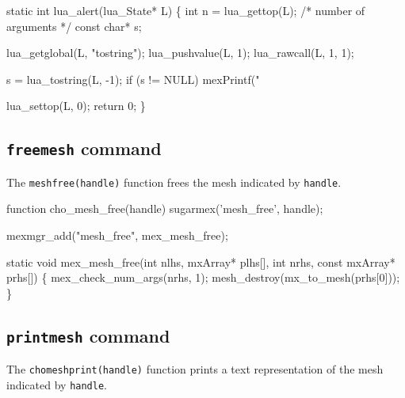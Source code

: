 \nwendcode{}\nwdocspar

\nwenddocs{}\plusendmoddef
static int lua_alert(lua_State* L)
\{
    int n = lua_gettop(L);  /* number of arguments */
    const char* s;

    lua_getglobal(L, "tostring");
    lua_pushvalue(L, 1);
    lua_rawcall(L, 1, 1);

    s = lua_tostring(L, -1);
    if (s != NULL)
        mexPrintf("%

    lua_settop(L, 0);
    return 0;
\}

\nwendcode{}\nwdocspar


\subsection{{\tt{}freemesh} command}

The {\tt{}mesh{}free(handle)} function frees the mesh indicated by {\tt{}handle}.

\nwenddocs{}\endmoddef
function cho_mesh_free(handle)
sugarmex('mesh_free', handle);
\nwendcode{}\nwdocspar

\nwenddocs{}\plusendmoddef
mexmgr_add("mesh_free", mex_mesh_free);
\nwendcode{}\nwdocspar

\nwenddocs{}\plusendmoddef
static void mex_mesh_free(int nlhs, mxArray* plhs[],
                          int nrhs, const mxArray* prhs[])
\{
    mex_check_num_args(nrhs, 1);
    mesh_destroy(mx_to_mesh(prhs[0]));
\}

\nwendcode{}\nwdocspar


\subsection{{\tt{}printmesh} command}

The {\tt{}cho{}mesh{}print(handle)} function prints a text representation of the
mesh indicated by {\tt{}handle}.

